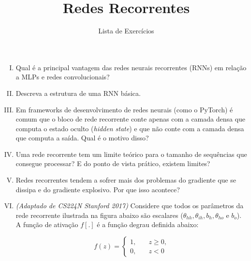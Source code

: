 \documentclass{dlproblemset}
\title{Redes Recorrentes}
\subtitle{Lista de Exercícios}
\begin{document}
\begin{enumerate}[I)]

\subsection*{Redes Recorrentes}
    \item Qual é a principal vantagem das redes neurais recorrentes (RNNs) em relação a MLPs e redes convolucionais?

    \item  Descreva a estrutura de uma RNN básica.

    \item Em frameworks de desenvolvimento de redes neurais (como o PyTorch) é comum que o bloco de rede recorrente conte apenas com a camada densa que computa o estado oculto (\textit{hidden state}) e que não conte com a camada densa que computa a saída. Qual é o motivo disso?

    \item Uma rede recorrente tem um limite teórico para o tamanho de sequências que consegue processar? E do ponto de vista prático, existem limites?

    \item Redes recorrentes tendem a sofrer mais dos problemas do gradiente que se dissipa e do gradiente explosivo. Por que isso acontece?

    \item \textit{(Adaptado de CS224N Stanford 2017)} Considere que todos os parâmetros da rede recorrente ilustrada na figura abaixo são escalares ($\theta_{hh}, \theta_{ih}, b_{h}, \theta_{ho}$ e  $b_{o}$). A função de ativação $f[.]$ é a função degrau definida abaixo:
    
\[   
f(z) = 
     \begin{cases}
       1, &\quad z \ge 0,\\
       0, &\quad z < 0
     \end{cases}
\]
    

\end{enumerate}
\end{document}
